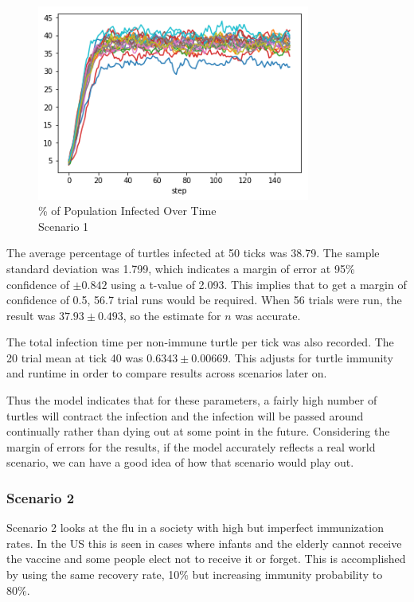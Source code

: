 \documentclass[11pt]{article} %
\begin{document}
\begin{figure}
\centering
\includegraphics[width=0.8\textwidth]{scen_1_steady_state}
\caption{\% of Population Infected Over Time \\ Scenario 1}
\end{figure}



The average percentage of turtles infected at 50 ticks was 38.79. The sample standard deviation was 1.799, which indicates a margin of error at 95\% confidence of $\pm 0.842$ using a t-value of 2.093. This implies that to get a margin of confidence of 0.5, 56.7 trial runs would be required. When 56 trials were run, the result was $37.93 \pm 0.493$, so the estimate for $n$ was accurate. 

The total infection time per non-immune turtle per tick was also recorded. The 20 trial mean at tick 40 was $0.6343 \pm 0.00669$. This adjusts for turtle immunity and runtime in order to compare results across scenarios later on. 


Thus the model indicates that for these parameters, a fairly high number of turtles will contract the infection and the infection will be passed around continually rather than dying out at some point in the future. Considering the margin of errors for the results, if the model accurately reflects a real world scenario, we can have a good idea of how that scenario would play out. 

\subsubsection{Scenario 2}

Scenario 2 looks at the flu in a society with high but imperfect immunization rates. In the US this is seen in cases where infants and the elderly cannot receive the vaccine and some people elect not to receive it or forget. This is accomplished by using the same recovery rate, 10\% but increasing immunity probability to 80\%. 
\end{document}
